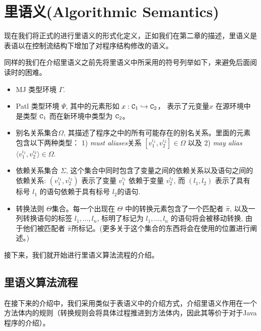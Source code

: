 
\newcommand{\pr}[1]{\langle{#1}\rangle}

\chapter{里语义(Algorithmic Semantics)}

现在我们将正式的进行里语义的形式化定义，正如我们在第二章的描述，里语义是表语以在控制流结构下增加了对程序结构修改的语义。

同样的我们在介绍里语义之前先将里语义中所采用的符号列举如下，来避免后面阅读时的困难。

\begin{itemize}
\item MJ 类型环境 $\Gamma$.

\item Patl 类型环境 $\Psi$, 其中的元素形如 $x:\mathtt{C}_1\hookrightarrow\mathtt{C}_2$， 表示了元变量$x$ 在源环境中是类型 $\mathtt{C}_1$ 而在新环境中类型为 $\mathtt{C}_2$。

\item 别名关系集合$\Omega$, 其描述了程序之中的所有可能存在的别名关系。里面的元素包含以下两种类型： 1) \textit{must aliases}关系 $[v_1^{\iota_1},v_2^{\iota_2}]\in\Omega$ 以及 2) \textit{may alias} $\pr{v_1^{\iota_1},v_2^{\iota_2}}\in\Omega$.

\item 依赖关系集合 $\Sigma$, 这个集合中同时包含了变量之间的依赖关系以及语句之间的依赖关系: $(v_1^{\iota_1},v_2^{\iota_2})$ 表示了变量 $v_1^{\iota_1}$ 依赖于变量 $v_2^{\iota_2}$, 而 $(l_1,l_2)$ 表示了具有标号 $l_1$ 的语句依赖于具有标号 $l_2$的语句.

\item 转换法则 $\Theta$集合。每一个出现在 $\Theta$ 中的转换元素包含了一个匹配者 $\hat\pi$, 以及一列转换语句的标签 $l_1,...,l_n$, 标明了标记为 $l_1,...,l_n$ 的语句将会被移动转换, 由于他们被匹配者 $\hat\pi$所标记。(更多关于这个集合的东西将会在使用的位置进行阐述。)
\end{itemize}

接下来，我们就开始进行里语义算法流程的介绍。

\section{里语义算法流程}

在接下来的介绍中，我们采用类似于表语义中的介绍方式，介绍里语义作用在一个方法体内的规则（转换规则会将具体过程推进到方法体内，因此其等价于对于Java程序的介绍）。

